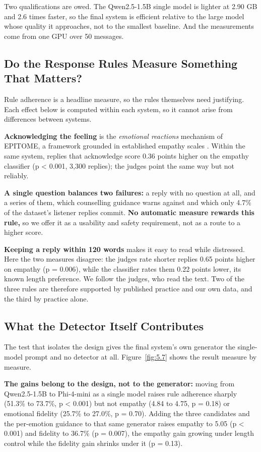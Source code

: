 Two qualifications are owed. The Qwen2.5-1.5B single model is lighter at 2.90 GB and 2.6 times faster, so the final system is efficient relative to the large model whose quality it approaches, not to the smallest baseline. And the measurements come from one GPU over 50 messages.

\subsection{Do the Response Rules Measure Something That Matters?}
\label{sec:5.5.4}

Rule adherence is a headline measure, so the rules themselves need justifying. Each effect below is computed within each system, so it cannot arise from differences between systems.

\textbf{Acknowledging the feeling} is the \textit{emotional reactions} mechanism of EPITOME, a framework grounded in established empathy scales \cite{sharma2020epitome}. Within the same system, replies that acknowledge score 0.36 points higher on the empathy classifier (p < 0.001, 3,300 replies); the judges point the same way but not reliably.

\textbf{A single question balances two failures: }a reply with no question at all, and a series of them, which counselling guidance warns against \cite{samhsa2019tip35} and which only 4.7\% of the dataset's listener replies commit. \textbf{No automatic measure rewards this rule,} so we offer it as a usability and safety requirement, not as a route to a higher score.

\textbf{Keeping a reply within 120 words} makes it easy to read while distressed. Here the two measures disagree: the judges rate shorter replies 0.65 points higher on empathy (p = 0.006), while the classifier rates them 0.22 points lower, its known length preference. We follow the judges, who read the text. Two of the three rules are therefore supported by published practice and our own data, and the third by practice alone.

\subsection{What the Detector Itself Contributes}
\label{sec:5.5.5}

The test that isolates the design gives the final system's own generator the single-model prompt and no detector at all. Figure~\ref{fig:5.7} shows the result measure by measure.

\textbf{The gains belong to the design, not to the generator: }moving from Qwen2.5-1.5B to Phi-4-mini as a single model raises rule adherence sharply (51.3\% to 73.7\%, p < 0.001) but not empathy (4.84 to 4.75, p = 0.18) or emotional fidelity (25.7\% to 27.0\%, p = 0.70). Adding the three candidates and the per-emotion guidance to that same generator raises empathy to 5.05 (p < 0.001) and fidelity to 36.7\% (p = 0.007), the empathy gain growing under length control while the fidelity gain shrinks under it (p = 0.13).

